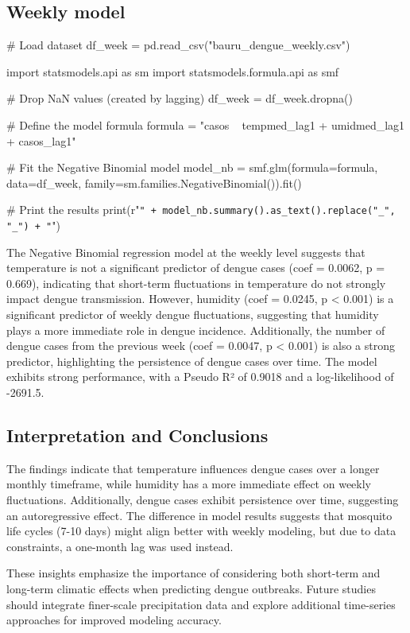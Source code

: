 \documentclass{article}
\begin{document}
\subsection*{Weekly model}

\begin{pycode}
# Load dataset
df_week = pd.read_csv("bauru_dengue_weekly.csv") 

import statsmodels.api as sm
import statsmodels.formula.api as smf

# Drop NaN values (created by lagging)
df_week = df_week.dropna()

# Define the model formula
formula = "casos ~ tempmed_lag1 + umidmed_lag1 + casos_lag1"

# Fit the Negative Binomial model
model_nb = smf.glm(formula=formula, data=df_week, 
                    family=sm.families.NegativeBinomial()).fit()

# Print the results
print(r"\texttt{" + model_nb.summary().as_text().replace("_", "\_") + "}")

\end{pycode}

The Negative Binomial regression model at the weekly level suggests that temperature is not a significant predictor of dengue cases (coef = 0.0062, p = 0.669), indicating that short-term fluctuations in temperature do not strongly impact dengue transmission. However, humidity (coef = 0.0245, p < 0.001) is a significant predictor of weekly dengue fluctuations, suggesting that humidity plays a more immediate role in dengue incidence. Additionally, the number of dengue cases from the previous week (coef = 0.0047, p < 0.001) is also a strong predictor, highlighting the persistence of dengue cases over time. The model exhibits strong performance, with a Pseudo R² of 0.9018 and a log-likelihood of -2691.5.

\subsection*{Interpretation and Conclusions}

The findings indicate that temperature influences dengue cases over a longer monthly timeframe, while humidity has a more immediate effect on weekly fluctuations. Additionally, dengue cases exhibit persistence over time, suggesting an autoregressive effect. The difference in model results suggests that mosquito life cycles (7-10 days) might align better with weekly modeling, but due to data constraints, a one-month lag was used instead.

These insights emphasize the importance of considering both short-term and long-term climatic effects when predicting dengue outbreaks. Future studies should integrate finer-scale precipitation data and explore additional time-series approaches for improved modeling accuracy.
\end{document}
